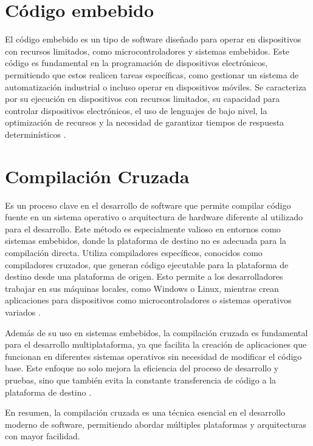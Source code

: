 \section{Código embebido}

El código embebido es un tipo de software diseñado para operar en dispositivos con recursos limitados, como microcontroladores y sistemas embebidos. Este código es fundamental en la programación de dispositivos electrónicos, permitiendo que estos realicen tareas específicas, como gestionar un sistema de automatización industrial o incluso operar en dispositivos móviles. Se caracteriza por su ejecución en dispositivos con recursos limitados, su capacidad para controlar dispositivos electrónicos, el uso de lenguajes de bajo nivel, la optimización de recursos y la necesidad de garantizar tiempos de respuesta determinísticos \cite{galeano2009programacion} \cite{sugezky2016desarrollo}.

\section{Compilación Cruzada}

Es un proceso clave en el desarrollo de software que permite compilar código fuente en un sistema operativo o arquitectura de hardware diferente al utilizado para el desarrollo. Este método es especialmente valioso en entornos como sistemas embebidos, donde la plataforma de destino no es adecuada para la compilación directa. Utiliza compiladores específicos, conocidos como compiladores cruzados, que generan código ejecutable para la plataforma de destino desde una plataforma de origen. Esto permite a los desarrolladores trabajar en sus máquinas locales, como Windows o Linux, mientras crean aplicaciones para dispositivos como microcontroladores o sistemas operativos variados \cite{sierra2012compilacion}.

Además de su uso en sistemas embebidos, la compilación cruzada es fundamental para el desarrollo multiplataforma, ya que facilita la creación de aplicaciones que funcionan en diferentes sistemas operativos sin necesidad de modificar el código base. Este enfoque no solo mejora la eficiencia del proceso de desarrollo y pruebas, sino que también evita la constante transferencia de código a la plataforma de destino \cite{thomas2018tendencias}. 

En resumen, la compilación cruzada es una técnica esencial en el desarrollo moderno de software, permitiendo abordar múltiples plataformas y arquitecturas con mayor facilidad.

